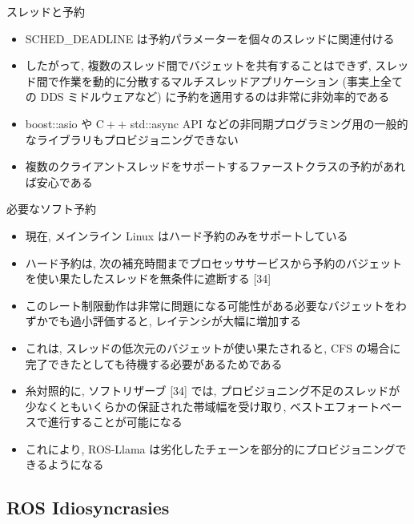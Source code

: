 \begin{frame}{スレッドと予約}
    \begin{itemize}
        \item SCHED\_DEADLINE は予約パラメーターを個々のスレッドに関連付ける
\item したがって, 複数のスレッド間でバジェットを共有することはできず, スレッド間で作業を動的に分散するマルチスレッドアプリケーション (事実上全ての DDS ミドルウェアなど) に予約を適用するのは非常に非効率的である
\item boost::asio や $\mathrm{C}++$ std::async API などの非同期プログラミング用の一般的なライブラリもプロビジョニングできない
\item 複数のクライアントスレッドをサポートするファーストクラスの予約があれば安心である
    \end{itemize}
\end{frame}

\begin{frame}{必要なソフト予約}
    \begin{itemize}
        \item 現在, メインライン Linux はハード予約のみをサポートしている
\item ハード予約は, 次の補充時間までプロセッササービスから予約のバジェットを使い果たしたスレッドを無条件に遮断する [34]
\item このレート制限動作は非常に問題になる可能性がある必要なバジェットをわずかでも過小評価すると, レイテンシが大幅に増加する
\item これは, スレッドの低次元のバジェットが使い果たされると, CFS の場合に完了できたとしても待機する必要があるためである
\item 糸対照的に, ソフトリザーブ [34] では, プロビジョニング不足のスレッドが少なくともいくらかの保証された帯域幅を受け取り, ベストエフォートベースで進行することが可能になる
\item これにより, ROS-Llama は劣化したチェーンを部分的にプロビジョニングできるようになる
    \end{itemize}
\end{frame}


\subsection{ROS Idiosyncrasies}
\label{ssec: ros idiosyncrasies}

